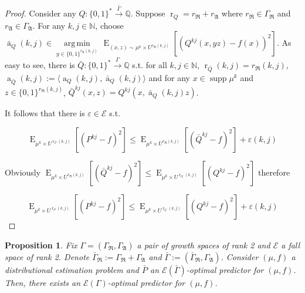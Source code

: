 \documentclass{article}
\theoremstyle{definition}
\theoremstyle{plain}
\newtheorem{proposition}{Proposition}[section]
\newcommand{\Words}{{\{ 0, 1 \}^*}}
\newcommand{\WordsLen}[1]{{\{ 0, 1 \}^{#1}}}
\DeclareMathOperator{\Supp}{supp}
\DeclareMathOperator{\E}{E}
\DeclareMathOperator{\R}{r}
\DeclareMathOperator{\A}{a}
\newcommand{\Argmin}[1]{\underset{#1}{\operatorname{arg\,min}}\,}
\newcommand{\Nats}{\mathbb{N}}
\newcommand{\Rats}{\mathbb{Q}}
\newcommand{\Chev}[1]{\langle #1 \rangle}
\begin{document}
\begin{proof}

Consider any $Q: \Words \xrightarrow{\bar{\Gamma}} \Rats$. Suppose $\R_Q=r_{\mathfrak{R}}+r_{\mathfrak{A}}$ where $r_{\mathfrak{R}} \in \Gamma_{\mathfrak{R}}$ and $r_{\mathfrak{A}} \in \Gamma_{\mathfrak{A}}$. For any $k,j \in \Nats$, choose ${\bar{\A}_Q(k,j) \in \Argmin{y \in \WordsLen{r_{\mathfrak{A}}(k,j)}} \E_{(x,z) \sim \mu^k \times U^{r_{\mathfrak{R}}(k,j)}}[(Q^{kj}(x,yz) - f(x))^2]}$. As easy to see, there is $\bar{Q}: \Words \xrightarrow{\Gamma} \Rats$ s.t. for all $k,j \in \Nats$, $\R_{\bar{Q}}(k,j) = r_{\mathfrak{R}}(k,j)$, $\A_{\bar{Q}}(k,j):=\Chev{\A_Q(k,j),\bar{\A}_Q(k,j)}$ and for any $x \in \Supp \mu^k$ and $z \in \WordsLen{r_{\mathfrak{R}}(k,j)}$, ${\bar{Q}^{kj}(x,z)=Q^{kj}(x,\bar{\A}_Q(k,j)z)}$.

It follows that there is $\varepsilon \in \mathcal{E}$ s.t.

$$\E_{\mu^k \times U^{\R_P(k,j)}}[(P^{kj} - f)^2] \leq \E_{\mu^k \times U^{r_{\mathfrak{R}}(k,j)}}[(\bar{Q}^{kj} - f)^2] + \varepsilon(k,j)$$

Obviously $\E_{\mu^k \times U^{r_{\mathfrak{R}}(k,j)}}[(\bar{Q}^{kj} - f)^2] \leq \E_{\mu^k \times U^{\R_Q(k,j)}}[(Q^{kj} - f)^2]$ therefore

$$\E_{\mu^k \times U^{\R_P(k,j)}}[(P^{kj} - f)^2] \leq \E_{\mu^k \times U^{\R_Q(k,j)}}[(Q^{kj} - f)^2] + \varepsilon(k,j)$$

\end{proof}

\begin{proposition}

Fix $\Gamma=(\Gamma_{\mathfrak{R}},\Gamma_{\mathfrak{A}})$ a pair of growth spaces of rank 2 and $\mathcal{E}$ a fall space of rank 2. Denote $\bar{\Gamma}_{\mathfrak{R}}:=\Gamma_{\mathfrak{R}}+\Gamma_{\mathfrak{A}}$ and $\bar{\Gamma}:=(\bar{\Gamma}_{\mathfrak{R}},\Gamma_{\mathfrak{A}})$. Consider $(\mu,f)$ a distributional estimation problem and $\bar{P}$ an $\mathcal{E}(\bar{\Gamma})$-optimal predictor for $(\mu,f)$. Then, there exists an $\mathcal{E}(\Gamma)$-optimal predictor for $(\mu,f)$.

\end{proposition}
\end{document}
